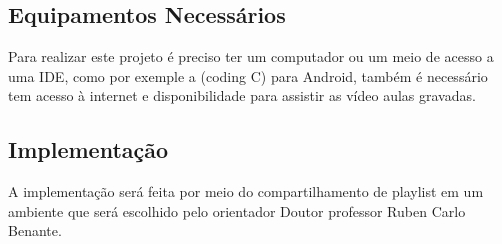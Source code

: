 \documentclass[a4paper,12pt]{article}  %
\begin{document}
 \subsection{Equipamentos Necessários}


   Para realizar este projeto é preciso ter um computador ou um meio de acesso a uma IDE, como por exemple a (coding C) para Android, também é necessário tem acesso à internet e disponibilidade para assistir as vídeo aulas gravadas.



 \subsection{Implementação}

   A implementação será feita por meio do compartilhamento de playlist em um ambiente que será escolhido pelo orientador Doutor professor Ruben Carlo Benante.




\end{document}

